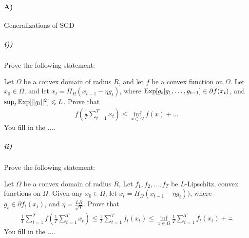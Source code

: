 \documentclass[12pt]{article}
\begin{document}
\paragraph{A)} Generalizations of SGD
\subparagraph{i))} Prove the following statement:
\begin{proposition*} Let $\Omega$ be a convex domain of radius $R$, and let $f$ be a convex function on $\Omega$. Let $x_0 \in \Omega$, and let $x_{t} = \Pi_{\Omega}(x_{t-1} - \eta g_t )$, where $\mathrm{Exp}[g_t | g_1,\dots,g_{t-1}] \in \partial f(x_t)$, and $\sup_{t} \mathrm{Exp}[\|g_t\|^2] \leqslant L$.  Prove that 
\begin{eqnarray}
 f(\frac{1}{T}\sum_{t=1}^T x_t) \le \inf_{x \in \Omega} f(x) + \dots
\end{eqnarray}
You fill in the $\dots$.
\end{proposition*}
\subparagraph{ii)} Prove the following statement:
\begin{proposition*}  Let $\Omega$ be a convex domain of radius $R$, Let $f_1,f_2,\dots,f_T$ be $L$-Lipschitz, convex functions on $\Omega$. Given any $x_0 \in \Omega$, let $x_{t} = \Pi_{\Omega}(x_{t-1} - \eta g_t ))$, where $g_t \in \partial f_t(x_t)$, and  $\eta = \frac{LR}{\sqrt{T}}$. Prove that
\begin{eqnarray}
\frac{1}{T}\sum_{t=1}^{T} f(\frac{1}{T}\sum_{t=1}^T x_t) \le \frac{1}{T}\sum_{t=1}^Tf_t(x_t) \le \inf_{x \in \Omega}\frac{1}{T}\sum_{t=1}^Tf_t(x_t) + \frac{\dots}{}
\end{eqnarray}
You fill in the $\dots$.
\end{proposition*}
\end{document}
